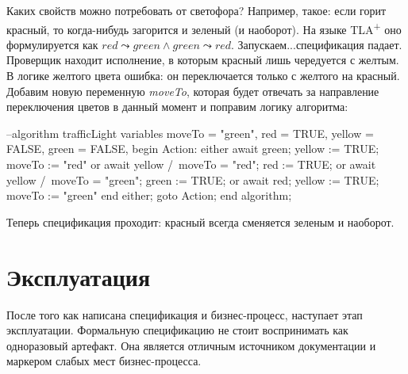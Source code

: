 \documentclass[14pt, openany]{book}
\newcommand{\tlapl}{TLA\textsuperscript{+} }
\begin{document}
Каких свойств можно потребовать от светофора? Например, такое: если горит красный, то когда-нибудь загорится и зеленый (и наоборот). На языке \tlapl оно формулируется как \(red \leadsto green \land green \leadsto red \). Запускаем...спецификация падает. Проверщик находит исполнение, в которым красный лишь чередуется с желтым. В логике желтого цвета ошибка: он переключается только с желтого на красный. Добавим новую переменную \emph{moveTo}, которая будет отвечать за направление переключения цветов в данный момент и поправим логику алгоритма:

\begin{ppcal}
  --algorithm trafficLight
  variables
    moveTo = "green",
    red = TRUE,
    yellow = FALSE,
    green = FALSE,
  begin
    Action:
      either
        await green;
        yellow := TRUE;
        moveTo := "red"
      or 
        await yellow /\ moveTo = "red";
        red := TRUE;
      or 
        await yellow /\ moveTo = "green";
        green := TRUE;
      or 
        await red;
        yellow := TRUE;
        moveTo := "green"
      end either;
    goto Action;
  end algorithm;
\end{ppcal}
\begin{tlatex}
%
%
%
%
%
%
%
%
%
%
%
%
%
%
%
%
%
%
%
%
%
%
%
\end{tlatex}

Теперь спецификация проходит: красный всегда сменяется зеленым и наоборот.

\section{Эксплуатация}
После того как написана спецификация и бизнес-процесс, наступает этап эксплуатации.
Формальную спецификацию не стоит воспринимать как одноразовый артефакт. Она является отличным источником документации и маркером слабых мест бизнес-процесса. 
\end{document}
